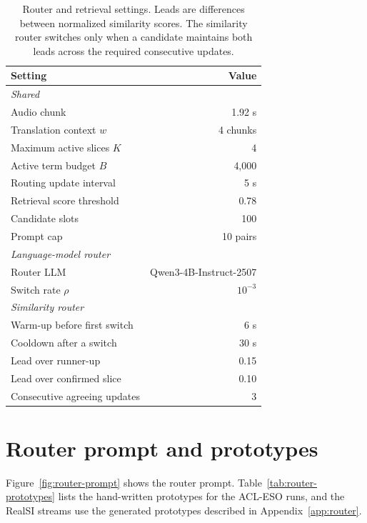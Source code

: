 \begin{table}[!ht]
\centering
\small
\setlength{\tabcolsep}{4pt}
\begin{tabular}{lr}
\toprule
Setting & Value \\
\midrule
\multicolumn{2}{l}{\emph{Shared}} \\
Audio chunk & 1.92 s \\
Translation context $w$ & 4 chunks \\
Maximum active slices $K$ & 4 \\
Active term budget $B$ & 4,000 \\
Routing update interval & 5 s \\
Retrieval score threshold & 0.78 \\
Candidate slots & 100 \\
Prompt cap & 10 pairs \\
\midrule
\multicolumn{2}{l}{\emph{Language-model router}} \\
Router LLM & Qwen3-4B-Instruct-2507 \\
Switch rate $\rho$ & $10^{-3}$ \\
\midrule
\multicolumn{2}{l}{\emph{Similarity router}} \\
Warm-up before first switch & 6 s \\
Cooldown after a switch & 30 s \\
Lead over runner-up & 0.15 \\
Lead over confirmed slice & 0.10 \\
Consecutive agreeing updates & 3 \\
\bottomrule
\end{tabular}
\caption{Router and retrieval settings. Leads are differences between normalized
similarity scores. The similarity router switches only when a candidate
maintains both leads across the required consecutive updates.}
\label{tab:config}
\end{table}

\section{Router prompt and prototypes}

Figure~\ref{fig:router-prompt} shows the router prompt.
Table~\ref{tab:router-prototypes} lists the hand-written prototypes for the
ACL-ESO runs, and the RealSI streams use the generated prototypes described in
Appendix~\ref{app:router}.

